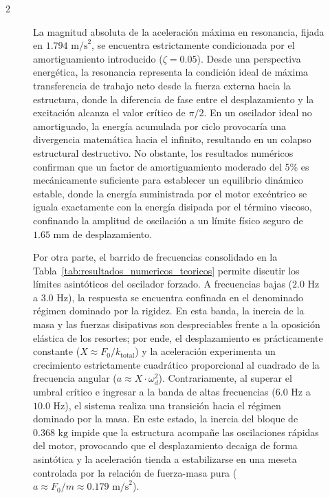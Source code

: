 \documentclass[10pt]{article}
\begin{document}
\begin{multicols}{2}
\begin{figure}[ht]
La magnitud absoluta de la aceleración máxima en resonancia, fijada en $1.794\text{ m/s}^2$, se encuentra estrictamente condicionada por el amortiguamiento introducido ($\zeta = 0.05$). Desde una perspectiva energética, la resonancia representa la condición ideal de máxima transferencia de trabajo neto desde la fuerza externa hacia la estructura, donde la diferencia de fase entre el desplazamiento y la excitación alcanza el valor crítico de $\pi/2$. En un oscilador ideal no amortiguado, la energía acumulada por ciclo provocaría una divergencia matemática hacia el infinito, resultando en un colapso estructural destructivo. No obstante, los resultados numéricos confirman que un factor de amortiguamiento moderado del 5\% es mecánicamente suficiente para establecer un equilibrio dinámico estable, donde la energía suministrada por el motor excéntrico se iguala exactamente con la energía disipada por el término viscoso, confinando la amplitud de oscilación a un límite físico seguro de $1.65\text{ mm}$ de desplazamiento.

Por otra parte, el barrido de frecuencias consolidado en la Tabla~\ref{tab:resultados_numericos_teoricos} permite discutir los límites asintóticos del oscilador forzado. A frecuencias bajas ($2.0\text{ Hz}$ a $3.0\text{ Hz}$), la respuesta se encuentra confinada en el denominado régimen dominado por la rigidez. En esta banda, la inercia de la masa y las fuerzas disipativas son despreciables frente a la oposición elástica de los resortes; por ende, el desplazamiento es prácticamente constante ($X \approx F_0/k_{\text{total}}$) y la aceleración experimenta un crecimiento estrictamente cuadrático proporcional al cuadrado de la frecuencia angular ($a \approx X \cdot \omega_d^2$). Contrariamente, al superar el umbral crítico e ingresar a la banda de altas frecuencias ($6.0\text{ Hz}$ a $10.0\text{ Hz}$), el sistema realiza una transición hacia el régimen dominado por la masa. En este estado, la inercia del bloque de $0.368\text{ kg}$ impide que la estructura acompañe las oscilaciones rápidas del motor, provocando que el desplazamiento decaiga de forma asintótica y la aceleración tienda a estabilizarse en una meseta controlada por la relación de fuerza-masa pura ($a \approx F_0/m \approx 0.179\text{ m/s}^2$).


\end{figure}
\end{multicols}
\end{document}
